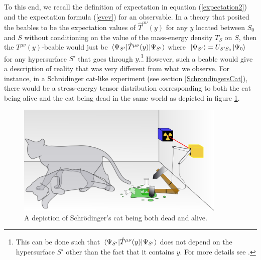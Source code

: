 To this end, we recall the definition of expectation in equation (\ref{expectation2}) and the expectation formula (\ref{evev}) for an observable. In a theory that posited the beables to be the expectation values of $\hat{T}^{\mu\nu}(y)$ for any $y$ located between $S_0$ and $S$  without conditioning on the value of the mass-energy density $T_S$ on $S$, then the $T^{\mu\nu}(y)$-beable would just be $\ev*{\hat{T}^{\mu\nu}(y)}{\Psi_{S'}}$ where $\ket*{\Psi_{S'}}=U_{S'S_0}\ket*{\Psi_0}$ for any hypersurface $S'$ that goes through $y$.\footnote{This can be done such that $\ev*{\hat{T}^{\mu\nu}(y)}{\Psi_{S'}}$ does not depend on the hypersurface $S'$ other than the fact that it contains $y$. For more details see \cite{SchwingerJulianI}.} However, such a beable would give a description of reality that was very different from what we observe. For instance, in a Schr\"{o}dinger cat-like experiment (see section \ref{SchrondingersCat}), there would be a stress-energy tensor distribution corresponding to both the cat being alive and the cat being dead in the same world as depicted in figure \ref{deadlivecat2}.
\begin{figure}[ht!]
  \captionsetup{justification=justified}
  \centering
  \includegraphics[width=100mm]{Chapter03/Schrodingers_cat.png}
  \caption[Depiction of Schr\"{o}dinger's cat]{A depiction of Schr\"{o}dinger's cat being both dead and alive.\protect\footnotemark}
  \label{deadlivecat2}
  \end{figure}
